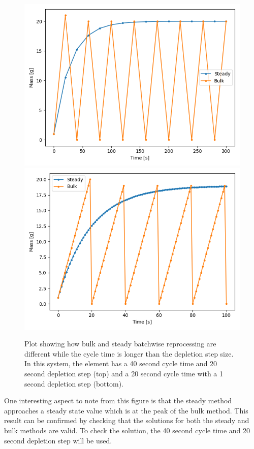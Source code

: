 \begin{figure}[H]
  \centering
  \includegraphics[scale=0.75]{images/batch-40-20.png}
  \includegraphics[scale=0.75]{images/batch-20-1.png}
  \caption{Plot showing how bulk and steady batchwise reprocessing are different while the cycle time is longer than the depletion step size. In this system, the element has a 40 second cycle time and 20 second depletion step (top) and a 20 second cycle time with a 1 second depletion step (bottom).}
   \label{fig:bulk_repr_diff}
\end{figure}

One interesting aspect to note from this figure is that the steady method approaches a steady state value which is at the peak of the bulk method. This result can be confirmed by checking that the solutions for both the steady and bulk methods are valid. To check the solution, the 40 second cycle time and 20 second depletion step will be used.

